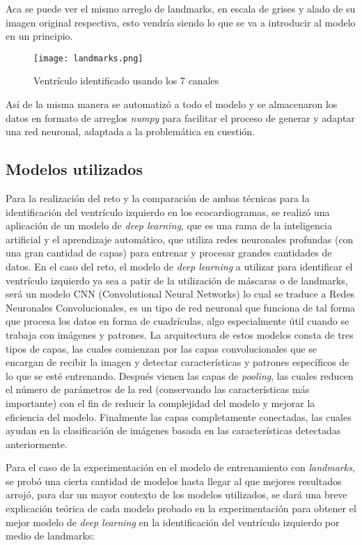 \documentclass[runningheads]{llncs}
\begin{document}
Aca se puede ver el mismo arreglo de landmarks, en escala de grises y alado de su imagen original respectiva, esto vendría siendo lo que se va a introducir al modelo en un principio.
\begin{figure} [H]
    \centering
    \texttt{[image: landmarks.png]}
    \caption{Ventrículo identificado usando los 7 canales}
    \label{fig:landmarks}
\end{figure}

Así de la misma manera se automatizó a todo el modelo y se almacenaron los datos en formato de arreglos \textit{numpy} para facilitar el proceso de generar y adaptar una red neuronal, adaptada a la problemática en cuestión.

\subsection{Modelos utilizados }

Para la realización del reto y la comparación de ambas técnicas para la identificación del ventrículo izquierdo en los ecocardiogramas, se realizó una aplicación de un modelo de \textit{deep learning}, que es una rama de la inteligencia artificial y el aprendizaje automático, que utiliza redes neuronales profundas (con una gran cantidad de capas) para entrenar y procesar grandes cantidades de datos. En el caso del reto, el modelo de \textit{deep learning} a utilizar para identificar el ventrículo izquierdo ya sea a patir de la utilización de máscaras o de landmarks, será un modelo CNN (Convolutional Neural Networks) lo cual se traduce a Redes Neuronales Convolucionales, es un tipo de red neuronal que funciona de tal forma que procesa los datos en forma de cuadrículas, algo especialmente útil cuando se trabaja con imágenes y patrones. La arquitectura de estos modelos consta de tres tipos de capas, las cuales comienzan por las capas convolucionales que se encargan de recibir la imagen y detectar características y patrones específicos de lo que se esté entrenando. Después vienen las capas de \textit{pooling}, las cuales reducen el número de parámetros de la red (conservando las características más importante) con el fin de reducir la complejidad del modelo y mejorar la eficiencia del modelo. Finalmente las capas completamente conectadas, las cuales ayudan en la clasificación de imágenes basada en las características detectadas anteriormente.  \citep{awati}

Para el caso de la experimentación en el modelo de entrenamiento con \textit{landmarks}, se probó una cierta cantidad de modelos hasta llegar al que mejores resultados arrojó, para dar un mayor contexto de los modelos utilizados, se dará una breve explicación teórica de cada modelo probado en la experimentación para obtener el mejor modelo de \textit{deep learning} en la identificación del ventrículo izquierdo por medio de landmarks:
\end{document}
